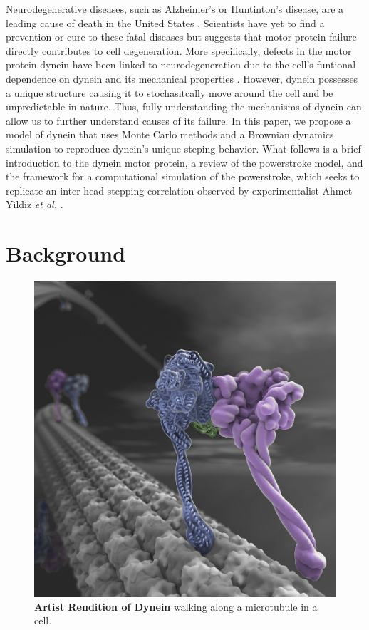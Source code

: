 
	Neurodegenerative diseases, such as Alzheimer's or Huntinton's disease, are a leading cause of death in the United States \cite{gammon2014neurodegenerative}. Scientists have yet to find a prevention or cure to these fatal diseases but suggests that motor protein failure directly contributes to cell degeneration. More specifically, defects in the motor protein dynein have been linked to neurodegeneration due to the cell's funtional dependence on dynein and its mechanical properties \cite{eschbach2011cytoplasmic}. However, dynein possesses a unique structure causing it to stochasitcally move around the cell and be unpredictable in nature. Thus, fully understanding the mechanisms of dynein can allow us to further understand causes of its failure. In this paper, we propose a model of dynein that uses Monte Carlo methods and a Brownian dynamics simulation to reproduce dynein's unique steping behavior. What follows is a brief introduction to the dynein motor protein, a review of the powerstroke model, and the framework for a computational simulation of the powerstroke, which seeks to replicate an inter head stepping correlation observed by experimentalist Ahmet Yildiz \textit{et al.} \cite{Dewitt2012}.  

\section{Background}

\begin{figure}[H]
	\centering
	\includegraphics[width=0.3\columnwidth]{Figures/dynein_walking_art.jpg}
	\caption[Artist Rendition of Dynein]{\textbf{Artist Rendition of Dynein} walking along a microtubule in a cell. \cite{JohnsonArt}}
	\label{fig:ArtDynein}
\end{figure}

